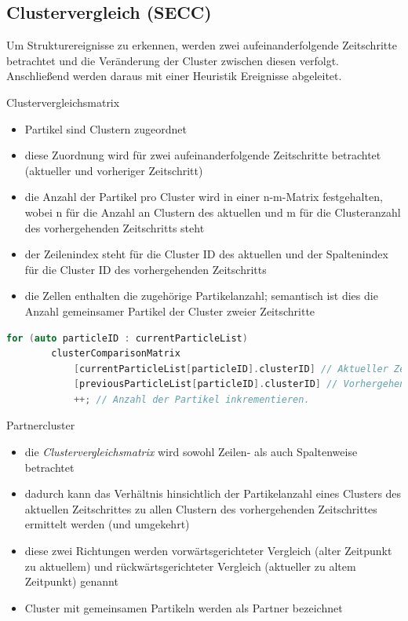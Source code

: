 \documentclass[10pt]{beamer}
\newcommand{\wichtig}[1]{\textit{#1}}
\begin{document}
\subsection{Clustervergleich (SECC)}

\begin{frame}
	Um Strukturereignisse zu erkennen, werden zwei aufeinanderfolgende Zeitschritte betrachtet und die Veränderung der Cluster zwischen diesen verfolgt. Anschließend werden daraus mit einer Heuristik Ereignisse abgeleitet.
\end{frame}

\begin{frame}[fragile]{Clustervergleichsmatrix}
	\begin{itemize}
		\item Partikel sind Clustern zugeordnet
		\item diese Zuordnung wird für zwei aufeinanderfolgende Zeitschritte betrachtet (aktueller und vorheriger Zeitschritt)
		\item die Anzahl der Partikel pro Cluster wird in einer n-m-Matrix festgehalten, wobei n für die Anzahl an Clustern des aktuellen und m für die Clusteranzahl des vorhergehenden Zeitschritts steht
		\item der Zeilenindex steht für die Cluster ID des aktuellen und der Spaltenindex für die Cluster ID des vorhergehenden Zeitschritts
		\item die Zellen enthalten die zugehörige Partikelanzahl; semantisch ist dies die Anzahl gemeinsamer Partikel der Cluster zweier Zeitschritte
	\end{itemize}
	
	\begin{lstlisting}[language=c]
	for (auto particleID : currentParticleList)
		clusterComparisonMatrix
			[currentParticleList[particleID].clusterID] // Aktueller Zeitschritt.
			[previousParticleList[particleID].clusterID] // Vorhergehender.
			++; // Anzahl der Partikel inkrementieren.
	\end{lstlisting}
\end{frame}

\begin{frame}{Partnercluster}
	\begin{itemize}
		\item die \wichtig{Clustervergleichsmatrix} wird sowohl Zeilen- als auch Spaltenweise betrachtet
		\item dadurch kann das Verhältnis hinsichtlich der Partikelanzahl eines Clusters des aktuellen Zeitschrittes zu allen Clustern des vorhergehenden Zeitschrittes ermittelt werden (und umgekehrt)
		\item diese zwei Richtungen werden vorwärtsgerichteter Vergleich (alter Zeitpunkt zu aktuellem) und rückwärtsgerichteter Vergleich (aktueller zu altem Zeitpunkt) genannt
		\item Cluster mit gemeinsamen Partikeln werden als Partner bezeichnet
	\end{itemize}
\end{frame}
\end{document}
